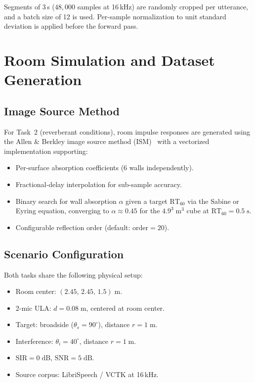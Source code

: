 \documentclass[a4paper]{article}
\begin{document}
Segments of 3\,s ($48{,}000$ samples at 16\,kHz) are randomly cropped per
utterance, and a batch size of 12 is used.  Per-sample normalization to unit
standard deviation is applied before the forward pass.

\section{Room Simulation and Dataset Generation}
\label{sec:data}

\subsection{Image Source Method}
\label{sec:ism}

For Task~2 (reverberant conditions), room impulse responses are generated
using the Allen \& Berkley image source method
(ISM)~\cite{allen1979ism} with a vectorized implementation supporting:
\begin{itemize}\itemsep0pt
\item Per-surface absorption coefficients (6 walls independently).
\item Fractional-delay interpolation for sub-sample accuracy.
\item Binary search for wall absorption $\alpha$ given a target
      $\text{RT}_{60}$ via the Sabine or Eyring equation, converging to
      $\alpha\approx 0.45$ for the $4.9^3\;\text{m}^3$ cube at
      $\text{RT}_{60}=0.5\;\text{s}$.
\item Configurable reflection order (default: $\text{order}=20$).
\end{itemize}

\subsection{Scenario Configuration}
\label{sec:scenario}

Both tasks share the following physical setup:
\begin{itemize}\itemsep0pt
\item Room center: $(2.45,\,2.45,\,1.5)\;\text{m}$.
\item 2-mic ULA: $d=0.08\;\text{m}$, centered at room center.
\item Target: broadside ($\theta_s=90^\circ$), distance $r=1\;\text{m}$.
\item Interference: $\theta_i=40^\circ$, distance $r=1\;\text{m}$.
\item $\text{SIR}=0\;\text{dB}$, $\text{SNR}=5\;\text{dB}$.
\item Source corpus: LibriSpeech / VCTK at 16\,kHz.
\end{itemize}
\end{document}
